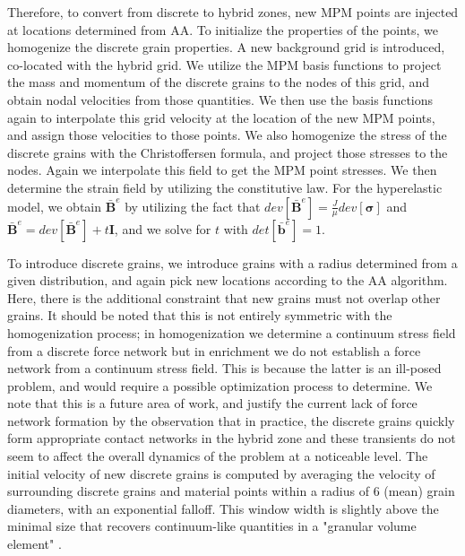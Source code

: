 Therefore, to convert from discrete to hybrid zones, new MPM points are injected at locations determined from AA. To initialize the properties of the points, we homogenize the discrete grain properties. A new background grid is introduced, co-located with the hybrid grid. We utilize the MPM basis functions to project the mass and momentum of the discrete grains to the nodes of this grid, and obtain nodal velocities from those quantities. We then use the basis functions again to interpolate this grid velocity at the location of the new MPM points, and assign those velocities to those points. We also homogenize the stress of the discrete grains with the Christoffersen formula, and project those stresses to the nodes. Again we interpolate this field to get the MPM point stresses. We then determine the strain field by utilizing the constitutive law. For the hyperelastic model, we obtain $\bar{\bm{B}}^e$ by utilizing the fact that $dev[\bar{\boldsymbol{B}}^e] = \frac{J}{\mu} dev[\bm{\sigma}]$ and $\bar{\boldsymbol{B}}^e = dev[\bar{\boldsymbol{B}}^e] + t \boldsymbol{I}$,
and we solve for $t$ with $det[\bar{\boldsymbol{b}}^e] = 1$. 

To introduce discrete grains, we introduce grains with a radius determined from a given distribution, and again pick new locations according to the AA algorithm. Here, there is the additional constraint that new grains must not overlap other grains. It should be noted that this is not entirely symmetric with the homogenization process; in homogenization we determine a continuum stress field from a discrete force network but in enrichment we do not establish a force network from a continuum stress field. This is because the latter is an ill-posed problem, and would require a possible optimization process to determine. We note that this is a future area of work, and justify the current lack of force network formation by the observation that in practice, the discrete grains quickly form appropriate contact networks in the hybrid zone and these transients do not seem to affect the overall dynamics of the problem at a noticeable level. The initial velocity of new discrete grains is computed by averaging the velocity of surrounding discrete grains and material points within a radius of $6$ (mean) grain diameters, with an exponential
falloff. This window width is slightly above the minimal size that recovers
continuum-like quantities in a "granular volume element" \cite{Rycroft:2009}.

